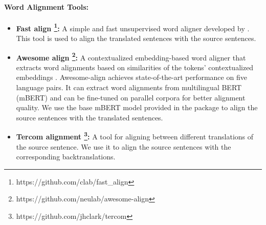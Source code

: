 \paragraph{Word Alignment Tools:}
\begin{itemize}
    \item \textbf{Fast align \footnote{https://github.com/clab/fast\_align}:} A simple and fast unsupervised word aligner developed by \citet{fast-align}. This tool is used to align the translated sentences with the source sentences.
    \item \textbf{Awesome align \footnote{https://github.com/neulab/awesome-align}:} A contextualized embedding-based word aligner that extracts word alignments based on similarities of the tokens’ contextualized embeddings \parencite{awesome-align}. Awesome-align achieves state-of-the-art performance on five language pairs. It can extract word alignments from multilingual BERT (mBERT) and can be fine-tuned on parallel corpora for better alignment quality. We use the base mBERT model provided in the package to align the source sentences with the translated sentences.
    \item \textbf{Tercom alignment \footnote{https://github.com/jhclark/tercom}:} A tool for aligning between different translations of the source sentence. We use it to align the source sentences with the corresponding backtranslations.
\end{itemize}


